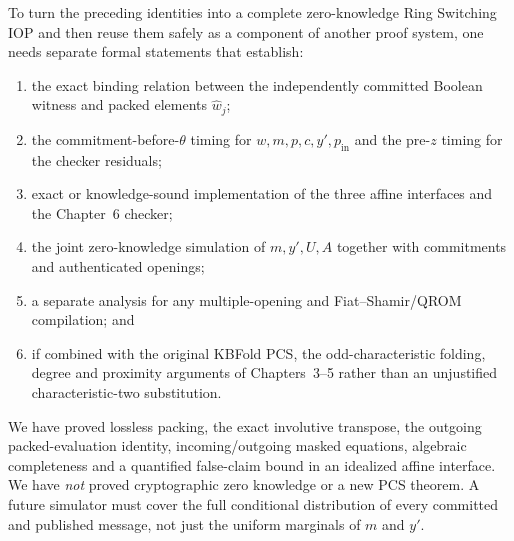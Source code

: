 \begin{definition}\label{def:pack:obligations}
To turn the preceding identities into a
complete zero-knowledge Ring Switching IOP
and then reuse them safely as a component
of another proof system, one needs separate
formal statements that establish:
\begin{enumerate}[label=\textup{(\roman*)}]
\item the exact binding relation between
the independently committed Boolean
witness and packed elements $\widehat w_j$;
\item the commitment-before-$\theta$ timing
for $w,m,p,c,y',p_{\mathrm{in}}$ and the
pre-$z$ timing for the checker residuals;
\item exact or knowledge-sound
implementation of the three affine
interfaces and the Chapter~6 checker;
\item the joint zero-knowledge simulation
of $m,y',U,A$ together with
commitments and authenticated openings;
\item a separate analysis for any
multiple-opening and Fiat--Shamir/QROM
compilation; and
\item if combined with the original KBFold
PCS, the odd-characteristic folding,
degree and proximity arguments of
Chapters~3--5 rather than an
unjustified characteristic-two
substitution.
\end{enumerate}
\end{definition}

\begin{remark}
We have proved lossless packing,
the exact involutive transpose,
the outgoing packed-evaluation identity,
incoming/outgoing masked equations,
algebraic completeness and a quantified
false-claim bound in an idealized affine
interface. We have \emph{not} proved
cryptographic zero knowledge or a
new PCS theorem. A future simulator
must cover the full conditional
distribution of every committed and
published message, not just the
uniform marginals of $m$ and $y'$.
\end{remark}
